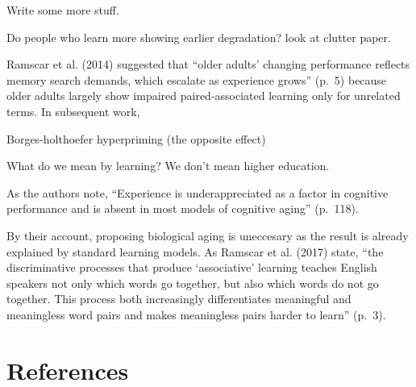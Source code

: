 \documentclass[
  man]{apa6}
\begin{document}
Write some more stuff.

Do people who learn more showing earlier degradation? look at clutter paper.

Ramscar et al. (2014) suggested that ``older adults' changing performance reflects memory search demands, which escalate as experience grows'' (p.~5) because older adults largely show impaired paired-associated learning only for unrelated terms. In subsequent work,

Borges-holthoefer hyperpriming (the opposite effect)

What do we mean by learning? We don't mean higher education.

As the authors note, ``Experience is underappreciated as a factor in cognitive performance and is absent in most models of cognitive aging'' (p.~118).

By their account, proposing biological aging is uneccesary as the result is already explained by standard learning models. As Ramscar et al. (2017) state, ``the discriminative processes that produce `associative' learning teaches English speakers not only which words go together, but also which words do not go together. This process both increasingly differentiates meaningful and meaningless word pairs and makes meaningless pairs harder to learn'' (p.~3).

\newpage

\hypertarget{references}{%
\section{References}\label{references}}
\end{document}
